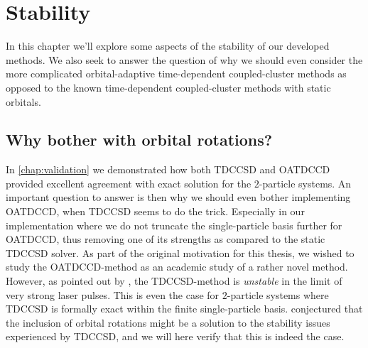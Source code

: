 \chapter{Stability}
    \label{chap:stability}
    In this chapter we'll explore some aspects of the stability of our developed
    methods.
    We also seek to answer the question of why we should even consider the more
    complicated orbital-adaptive time-dependent coupled-cluster methods as
    opposed to the known time-dependent coupled-cluster methods with static
    orbitals.

    \section{Why bother with orbital rotations?}
        In \autoref{chap:validation} we demonstrated how both TDCCSD and OATDCCD
        provided excellent agreement with exact solution for the $2$-particle
        systems.
        An important question to answer is then why we should even bother
        implementing OATDCCD, when TDCCSD seems to do the trick.
        Especially in our implementation where we do not truncate the
        single-particle basis further for OATDCCD, thus removing one of its
        strengths as compared to the static TDCCSD solver.
        As part of the original motivation for this thesis, we wished to study
        the OATDCCD-method as an academic study of a rather novel method.
        However, as pointed out by \citeauthor{pedersen2018symplectic}
        \cite{pedersen2018symplectic}, the TDCCSD-method is \emph{unstable} in
        the limit of very strong laser pulses.
        This is even the case for $2$-particle systems where TDCCSD is formally
        exact within the finite single-particle basis.
        \citeauthor{pedersen2018symplectic} conjectured that the inclusion of
        orbital rotations might be a solution to the stability issues
        experienced by TDCCSD, and we will here verify that this is indeed the
        case.

